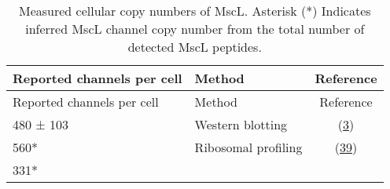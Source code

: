 \begin{longtable}[]{@{}llc@{}}
\caption{Measured
cellular
copy
numbers
of
MscL.
Asterisk
(*)
Indicates
inferred
MscL
channel
copy
number
from
the
total
number
of
detected
MscL
peptides.}\tabularnewline
\toprule
\begin{minipage}[b]{0.29\columnwidth}\raggedright\strut
Reported
channels
per
cell\strut
\end{minipage}
&
\begin{minipage}[b]{0.29\columnwidth}\raggedright\strut
Method\strut
\end{minipage}
&
\begin{minipage}[b]{0.34\columnwidth}\centering\strut
Reference\strut
\end{minipage}\tabularnewline
\midrule
\endfirsthead
\toprule
\begin{minipage}[b]{0.29\columnwidth}\raggedright\strut
Reported
channels
per
cell\strut
\end{minipage}
&
\begin{minipage}[b]{0.29\columnwidth}\raggedright\strut
Method\strut
\end{minipage}
&
\begin{minipage}[b]{0.34\columnwidth}\centering\strut
Reference\strut
\end{minipage}\tabularnewline
\midrule
\endhead
\begin{minipage}[t]{0.29\columnwidth}\raggedright\strut
480 ±
103\strut
\end{minipage}
&
\begin{minipage}[t]{0.29\columnwidth}\raggedright\strut
Western
blotting\strut
\end{minipage}
&
\begin{minipage}[t]{0.34\columnwidth}\centering\strut
(\protect\hyperlink{ref-bialecka-fornal2012}{3})\strut
\end{minipage}\tabularnewline
\begin{minipage}[t]{0.29\columnwidth}\raggedright\strut
560*\strut
\end{minipage}
&
\begin{minipage}[t]{0.29\columnwidth}\raggedright\strut
Ribosomal
profiling\strut
\end{minipage}
&
\begin{minipage}[t]{0.34\columnwidth}\centering\strut
(\protect\hyperlink{ref-li2014}{39})\strut
\end{minipage}\tabularnewline
\begin{minipage}[t]{0.29\columnwidth}\raggedright\strut
331*\strut
\end{minipage}

\end{longtable}
